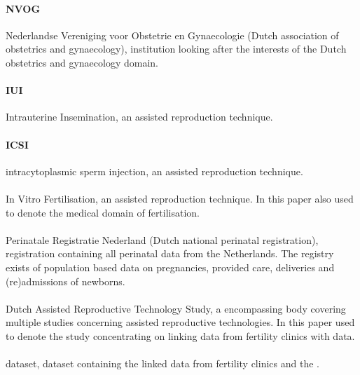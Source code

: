 \paragraph{NVOG}
Nederlandse Vereniging voor Obstetrie en Gynaecologie (Dutch association of obstetrics and gynaecology), institution looking after the interests of the Dutch obstetrics and gynaecology domain.

\paragraph{IUI}
Intrauterine Insemination, an assisted reproduction technique.

\paragraph{ICSI}
intracytoplasmic sperm injection, an assisted reproduction technique.

\paragraph{\IVF{}} 
In Vitro Fertilisation, an assisted reproduction technique.
In this paper also used to denote the medical domain of fertilisation.

\paragraph{\PRN{}}
Perinatale Registratie Nederland (Dutch national perinatal registration), registration containing all perinatal data from the Netherlands.
The registry exists of population based data on pregnancies, provided care, deliveries and (re)admissions of newborns.

\paragraph{\project{}} 
Dutch Assisted Reproductive Technology Study, a encompassing body covering multiple studies concerning assisted reproductive technologies.
In this paper used to denote the study concentrating on linking data from fertility clinics with \PRN{} data.

\paragraph{\projectdata{}}
\project{} dataset, dataset containing the linked data from fertility clinics and the \PRN{}.

